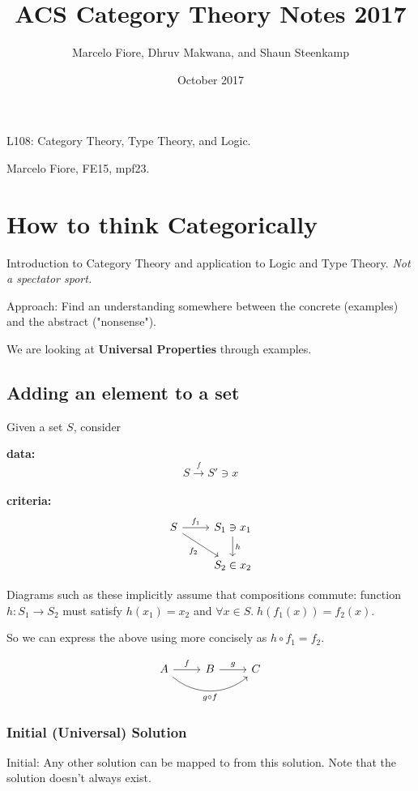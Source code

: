 \documentclass[a4paper, 12pt]{article}
\title{ACS Category Theory Notes 2017}
\date{\nth{5} October 2017}
\author{Marcelo Fiore, Dhruv Makwana, and Shaun Steenkamp}
\theoremstyle{definition}
\begin{document}
\maketitle

L108: Category Theory, Type Theory, and Logic.

Marcelo Fiore, FE15, mpf23.

\section{How to think Categorically}
Introduction to Category Theory and application to Logic and Type Theory.
\emph{Not a spectator sport.}

Approach: Find an understanding somewhere between the concrete (examples) and
the abstract ("nonsense").

We are looking at \textbf{Universal Properties} through examples.

\subsection{Adding an element to a set}
Given a set $S$, consider

\textbf{data:} $$ S \overset{f}{\rightarrow} S' \ni x $$ \\
\textbf{criteria:} $$
    \begin{tikzcd}
        S \arrow[r, "f_1"]
          \arrow[dr, swap, "f_2"]
          &
        S_1 \ni x_1 \arrow[d, "h"]
          \\
          {}&
        S_2 \in x_2
    \end{tikzcd}
$$

\begin{framed}
Diagrams such as these implicitly assume that compositions commute:
function $h : S_1 \rightarrow S_2$ must satisfy $h(x_1) = x_2$ and $\forall x
\in S .\; h(f_1(x)) = f_2(x)$.

So we can express the above using more concisely as $h \circ f_1 = f_2$.

$$
\begin{tikzcd}
    A \arrow[r, "f"] \arrow[rr, swap, bend right=40, "g \circ f"] & B \arrow[r, "g"] & C
\end{tikzcd}
$$

\end{framed}

\subsubsection*{Initial (Universal) Solution}
Initial: Any other solution can be mapped to from this solution. Note that the
solution doesn't always exist.
\end{document}
